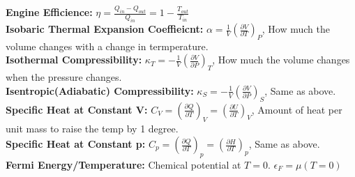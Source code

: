 \documentclass[12pt]{extarticle}
\begin{document}
\textbf{Engine Efficience:} $\eta = \frac{Q_{in}-Q_{out}}{Q_{in}} = 1-\frac{T_{out}}{T_{in}}$ \\
\textbf{Isobaric Thermal Expansion Coeffieicnt: } $\alpha = \frac{1}{V} \left(\frac{\partial V}{\partial T}\right)_P$, How much the volume changes with a change in termperature. \\
\textbf{Isothermal Compressibility:} $\kappa_T = -\frac{1}{V} \left(\frac{\partial V}{\partial P}\right)_T$, How much the volume changes when the pressure changes. \\
\textbf{Isentropic(Adiabatic) Compressibility:} $\kappa_S = -\frac{1}{V} \left(\frac{\partial V}{\partial P}\right)_S$, Same as above. \\
\textbf{Specific Heat at Constant V:} $C_V = \left(\frac{\partial Q}{\partial T}\right)_V = \left(\frac{\partial U}{\partial T}\right)_V$, Amount of heat per unit mass to raise the temp by 1 degree. \\
\textbf{Specific Heat at Constant p:} $C_p = \left(\frac{\partial Q}{\partial T}\right)_p = \left(\frac{\partial H}{\partial T}\right)_p$, Same as above. \\
\textbf{Fermi Energy/Temperature: } Chemical potential at $T=0$. $\epsilon_F = \mu(T=0)$
\end{document}
